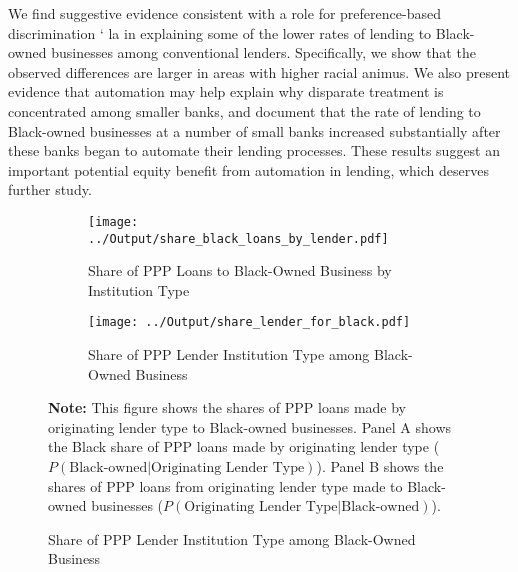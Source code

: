 \documentclass[11pt]{article}
\begin{document}
We find suggestive evidence consistent with a role for preference-based discrimination \a` la \cite{becker1957economics} in explaining some of the lower rates of lending to Black-owned businesses among conventional lenders. Specifically, we show that the observed differences are larger in areas with higher racial animus. We also present evidence that automation may help explain why disparate treatment is concentrated among smaller banks, and document that the rate of lending to Black-owned businesses at a number of small banks increased substantially after these banks began to automate their lending processes. These results suggest an important potential equity benefit from automation in lending, which deserves further study.


\newpage
\singlespacing{}



\newpage
\begin{figure}[H]
	\caption{\textbf{Black-Owned Business PPP Lending by Institution Type}} \label{f:bl50}
	\centering
	\begin{subfigure}{\linewidth}
		\caption{Share of PPP Loans to Black-Owned Business by Institution Type}
		\centering
		\texttt{[image: ../Output/share\_black\_loans\_by\_lender.pdf]}
		\vspace{0.5cm}
	\end{subfigure}

	\begin{subfigure}{\linewidth}
		\caption{Share of PPP Lender Institution Type among Black-Owned Business}
		\centering
		\texttt{[image: ../Output/share\_lender\_for\_black.pdf]}
	\end{subfigure}

	\begin{minipage}{\textwidth} \medskip
		\footnotesize{{\bf Note: }This figure shows the shares of PPP loans made by originating lender type to Black-owned businesses. Panel A shows the Black share of PPP loans made by originating lender type ($P(\text{Black-owned} | \text{Originating Lender Type})$). Panel B shows the shares of PPP loans from originating lender type made to Black-owned businesses ($P(\text{Originating Lender Type} | \text{Black-owned})$).}
	\end{minipage}
\end{figure}
\end{document}

